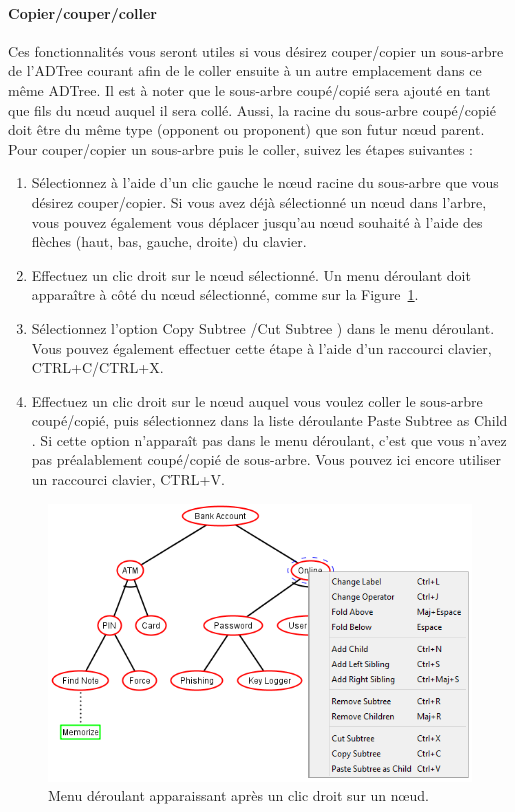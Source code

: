 \paragraph{Copier/couper/coller} Ces fonctionnalités vous seront utiles si vous désirez couper/copier un sous-arbre de l'ADTree courant afin de le coller ensuite à un autre emplacement dans ce même ADTree. Il est à noter que le sous-arbre coupé/copié sera ajouté en tant que fils du n\oe{}ud auquel il sera collé. Aussi, la racine du sous-arbre coupé/copié doit être du même type (opponent ou proponent) que son futur n\oe{}ud parent. Pour couper/copier un sous-arbre puis le coller, suivez les étapes suivantes : 
\begin{enumerate}
    \item Sélectionnez à l'aide d'un clic gauche le n\oe{}ud racine du sous-arbre que vous désirez couper/copier. Si vous avez déjà sélectionné un n\oe{}ud dans l'arbre, vous pouvez également vous déplacer jusqu'au n\oe{}ud souhaité à l'aide des flèches (haut, bas, gauche, droite) du clavier.
	\item Effectuez un clic droit sur le n\oe{}ud sélectionné. Un menu déroulant doit apparaître à côté du n\oe{}ud sélectionné, comme sur la {\sc Figure}~\ref{fig:clicdroit}.
	\item Sélectionnez l'option \og Copy Subtree \fg{}/\og Cut Subtree \fg{}) dans le menu déroulant. Vous pouvez également effectuer cette étape à l'aide d'un raccourci clavier, {\sc CTRL+C}/{\sc CTRL+X}.
	\item Effectuez un clic droit sur le n\oe{}ud auquel vous voulez coller le sous-arbre coupé/copié, puis sélectionnez dans la liste déroulante \og Paste Subtree as Child \fg{}. Si cette option n'apparaît pas dans le menu déroulant, c'est que vous n'avez pas préalablement coupé/copié de sous-arbre. Vous pouvez ici encore utiliser un raccourci clavier, {\sc CTRL+V}.
\end{enumerate}

    \begin{figure}[!h]
        \centering
        \includegraphics[height=0.7\textwidth]{figure/clicdroit.png}
        \caption{Menu déroulant apparaissant après un clic droit sur un n\oe{}ud.}
        \label{fig:clicdroit}
    \end{figure}

